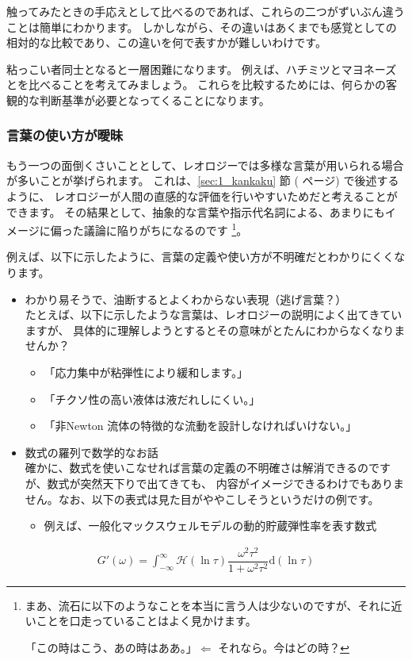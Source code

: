 \documentclass[uplatex,dvipdfmx,a4paper,11pt]{jsreport}
\begin{document}
触ってみたときの手応えとして比べるのであれば、これらの二つがずいぶん違うことは簡単にわかります。
しかしながら、その違いはあくまでも感覚としての相対的な比較であり、この違いを何で表すかが難しいわけです。

粘っこい者同士となると一層困難になります。
例えば、ハチミツとマヨネーズとを比べることを考えてみましょう。 
これらを比較するためには、何らかの客観的な判断基準が必要となってくることになります。

\subsubsection{言葉の使い方が曖昧}

もう一つの面倒くさいこととして、レオロジーでは多様な言葉が用いられる場合が多いことが挙げられます。
これは、\ref{sec:1_kankaku} 節 (\pageref{sec:1_kankaku} ページ) で後述するように、
レオロジーが人間の直感的な評価を行いやすいためだと考えることができます。
その結果として、抽象的な言葉や指示代名詞による、あまりにもイメージに偏った議論に陥りがちになるのです
\footnote{まあ、流石に以下のようなことを本当に言う人は少ないのですが、それに近いことを口走っていることはよく見かけます。
	
「この時はこう、あの時はああ。」$\Leftarrow$ それなら。今はどの時？}。

例えば、以下に示したように、言葉の定義や使い方が不明確だとわかりにくくなります。
	
	\begin{itemize}
		\item わかり易そうで、油断するとよくわからない表現（逃げ言葉？）\\
		たとえば、以下に示したような言葉は、レオロジーの説明によく出てきていますが、
		具体的に理解しようとするとその意味がとたんにわからなくなりませんか？
		\begin{itemize}
			\item 「応力集中が粘弾性により緩和します。」
			\item 「チクソ性の高い液体は液だれしにくい。」
			\item 「非Newton 流体の特徴的な流動を設計しなければいけない。」
		\end{itemize}
		\item 数式の羅列で数学的なお話\\
		確かに、数式を使いこなせれば言葉の定義の不明確さは解消できるのですが、数式が突然天下りで出てきても、
		内容がイメージできるわけでもありません。なお、以下の表式は見た目がややこしそうというだけの例です。
		\begin{itemize}
			\item 例えば、一般化マックスウェルモデルの動的貯蔵弾性率を表す数式\\
		\end{itemize}
	\end{itemize}
	\vspace{-7mm}
	\begin{align*}
		\displaystyle G'(\omega) = \int_{-\infty}^{\infty} \mathcal{H}(\ln \tau)\dfrac{\omega^2 \tau^2}{1 + \omega^2 \tau^2} \mathrm{d}(\ln \tau)
	\end{align*}
\end{document}
